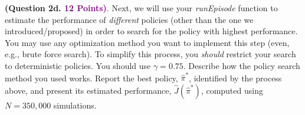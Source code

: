 \documentclass{article}
\newcommand{\POINTS}[1]{\textcolor{purple}{\textbf{{#1}}}}
\begin{document}
\textbf{(Question 2d. \POINTS{12 Points)}}. Next, we will use your \textit{runEpisode} function to estimate the performance of \textit{different} policies (other than the one we introduced/proposed) in order to search for the policy with highest performance. You may use any optimization method you want to implement this step (even, e.g., brute force search). To simplify this process, you \textit{should} restrict your search to deterministic policies. You should use $\gamma=0.75$. Describe how the policy search method you used works. Report the best policy, $\hat{\pi}^*$, identified by the process above, and present its estimated performance, $\hat{J}(\hat{\pi}^*)$, computed using $N=350,000$ simulations.
\end{document}
